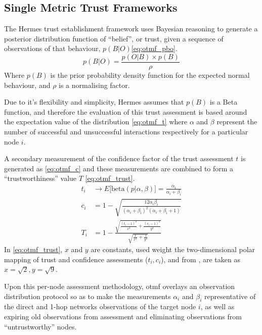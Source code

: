 \subsection{Single Metric Trust Frameworks}

The Hermes trust establishment framework \cite{Zouridaki2005} uses Bayesian reasoning to generate a posterior distribution function of ``belief'', or trust, given a sequence of observations of that behaviour, $p(B|O)$\eqref{eq:otmf_pbo}.
%
\begin{equation}
  p(B|O)  = \frac{p(O|B) \times p(B)}{\rho}
  \label{eq:otmf_pbo}
\end{equation}
%
Where $p(B)$ is the prior probability density function for the expected normal behaviour, and $\rho$ is a normalising factor.

Due to it's flexibility and simplicity, Hermes assumes that $p(B)$ is a Beta function, and therefore the evaluation of this trust assessment is based around the expectation value of the distribution \eqref{eq:otmf_t}  where $\alpha$ and $\beta$ represent the number of successful and unsuccessful interactions respectively for a particular node $i$.

A secondary measurement of the confidence factor of the trust assessment $t$ is generated as \eqref{eq:otmf_c} and these measurements are combined to form a ``trustworthiness'' value $T$ \eqref{eq:otmf_trust}.
%
\begin{align}
  t_i &\to E\lbrack\text{beta}(p|\alpha,\beta)\rbrack = \frac{\alpha_i}{\alpha_i+\beta_i} \label{eq:otmf_t}\\[5pt]
  c_i &= 1 - \sqrt{\frac{12\alpha_i\beta_i}{(\alpha_i+\beta_i)^2(\alpha_i+\beta_i+1)}} \label{eq:otmf_c}\\[5pt]
  T_i &= 1 - \frac{\sqrt{\frac{(t_i-1)^2}{x^2} + \frac{(c_i-1)^2}{y^2}}}{\sqrt{\frac{1}{x^2}+\frac{1}{y^2}}} \label{eq:otmf_trust}
\end{align}
%
In \eqref{eq:otmf_trust}, $x$ and $y$ are constants, used weight the two-dimensional polar mapping of trust and confidence assessments ($t_i,c_i$), and from \cite{Zouridaki2005}, are taken as $x=\sqrt{2},y=\sqrt{9}$.

Upon this per-node assessment methodology, \gls{otmf} overlays an observation distribution protocol so as to make the measurements $\alpha_i$ and $\beta_i$ representative of the direct and 1-hop networks observations of the target node $i$, as well as expiring old observations from assessment and eliminating observations from ``untrustworthy'' nodes.

